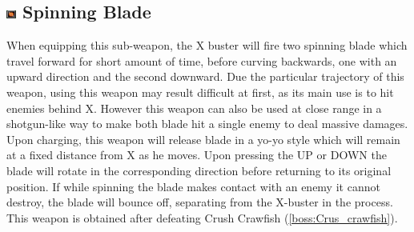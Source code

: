\subsection{\includegraphics[width=12px, height=10px]{figures/X3/weapons/S_blade.jpg} Spinning Blade}\label{Spinning_Blade}
When equipping this sub-weapon, the X buster will fire two spinning blade which travel forward for short amount of time, before curving backwards, one with an upward direction and the second downward. Due the particular trajectory of this weapon, using this weapon may result difficult at first, as its main use is to hit enemies behind X. However this weapon can also be used at close range in a shotgun-like way to make both blade hit a single enemy to deal massive damages. 
Upon charging, this weapon will release blade in a yo-yo style which will remain at a fixed distance from X as he moves. Upon pressing the UP or DOWN the blade will rotate in the  corresponding direction before returning to its original position. If while spinning the blade makes contact with an enemy it cannot destroy, the blade will bounce off, separating from the X-buster in the process.
This weapon is obtained after defeating Crush Crawfish (\ref{boss:Crus_crawfish}).

